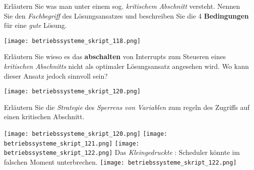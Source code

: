 \documentclass{article}
\begin{document}
\begin{tcolorbox}[colback=white!10!white,colframe=lightgray!75!black,
  savelowerto=\jobname_ex.tex]

\begin{center}
Erläutern Sie was man unter einem sog. 
\textit{kritischem Abschnitt
} versteht. Nennen Sie den 
\textit{Fachbegriff
} des Lösungsansatzes und beschreiben Sie die 4 
\textbf{Bedingungen
} für eine 
\textit{gute
} Lösung.

\end{center}

\tcblower

\justifying
\texttt{[image: betriebssysteme\_skript\_118.png]}

\end{tcolorbox}
\begin{tcolorbox}[colback=white!10!white,colframe=lightgray!75!black,
  savelowerto=\jobname_ex.tex]

\begin{center}
Erläutern Sie wieso es das 
\textbf{abschalten
} von Interrupts zum Steueren eines 
\textit{kritischen Abschnitts
} nicht als optimaler Lösungsansatz angesehen wird. Wo kann dieser Ansatz jedoch sinnvoll sein?

\end{center}

\tcblower

\justifying
\texttt{[image: betriebssysteme\_skript\_120.png]}

\end{tcolorbox}
\begin{tcolorbox}[colback=white!10!white,colframe=lightgray!75!black,
  savelowerto=\jobname_ex.tex]

\begin{center}
Erläutern Sie die 
\textit{Strategie
} des 
\textit{Sperrens von Variablen
} zum regeln des Zugriffs auf einen kritischen Abschnitt.

\end{center}

\tcblower

\justifying
\texttt{[image: betriebssysteme\_skript\_120.png]}
\texttt{[image: betriebssysteme\_skript\_121.png]}
\texttt{[image: betriebssysteme\_skript\_122.png]}
Das 
\textit{Kleingedruckte
}: Scheduler könnte im falschen Moment unterbrechen.
\texttt{[image: betriebssysteme\_skript\_122.png]}

\end{tcolorbox}
\end{document}
